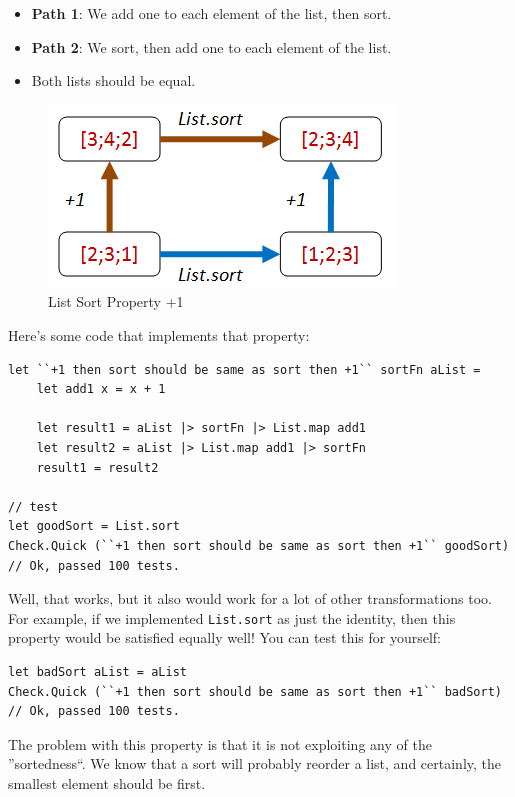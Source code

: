 \begin{itemize}
\item \textbf{Path 1}: We add one to each element of the list, then sort.
\item \textbf{Path 2}: We sort, then add one to each element of the list.
\item Both lists should be equal.
\end{itemize}
\begin{figure}[htbp]
 \centering
 \includegraphics[width=.95\linewidth]{./pics/choosing_properties_9.png}
 \caption{List Sort Property +1}
 \label{fig:choosing_properties_9}
\end{figure}
Here's some code that implements that property:

\begin{verbatim}
let ``+1 then sort should be same as sort then +1`` sortFn aList = 
    let add1 x = x + 1
    
    let result1 = aList |> sortFn |> List.map add1
    let result2 = aList |> List.map add1 |> sortFn 
    result1 = result2

// test 
let goodSort = List.sort
Check.Quick (``+1 then sort should be same as sort then +1`` goodSort)
// Ok, passed 100 tests.
\end{verbatim}
Well, that works, but it also would work for a lot of other transformations too. For example, if we implemented \texttt{List.sort} as just the identity, then this property would be satisfied equally well! You can test this for yourself:

\begin{verbatim}
let badSort aList = aList
Check.Quick (``+1 then sort should be same as sort then +1`` badSort)
// Ok, passed 100 tests.
\end{verbatim}
The problem with this property is that it is not exploiting any of the ''sortedness``. We know that a sort will probably reorder a list, and certainly, the smallest element should be first.

